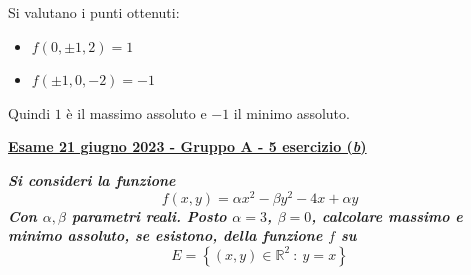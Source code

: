 \documentclass[a4paper]{article}
\newcommand{\definition}[1]{\textcolor{Red3}{\textbf{#1}}}
\newcommand{\example}[1]{\textcolor{Green4}{\textbf{#1}}}
\begin{document}
	Si valutano i punti ottenuti:
	\begin{multicols}{2}
		\begin{itemize}
			\item $f\left(0, \pm1, 2\right) = 1$
			\item $f\left(\pm1, 0, -2\right) = -1$
		\end{itemize}
	\end{multicols}
	Quindi $1$ è il massimo assoluto e $-1$ il minimo assoluto.

	\newpage

	\begin{flushleft}
		\label{exam: esame 21 giugno 2023 - Gruppo A - 5 esercizio (b)}
		\hypertarget{
			exam: esame 21 giugno 2023 - Gruppo A - 5 esercizio (b)
		}{
			\definition{\underline{Esame 21 giugno 2023 - Gruppo A - 5 esercizio (\emph{b})}}
		}
	\end{flushleft}
	\example{\emph{Si consideri la funzione}
	\begin{equation*}
		f\left(x,y\right) = \alpha x^{2} - \beta y^{2} - 4x + \alpha y
	\end{equation*}
	\emph{Con $\alpha, \beta$ parametri reali. Posto $\alpha = 3$, $\beta = 0$, calcolare massimo e minimo assoluto, se esistono, della funzione $f$ su}
	\begin{equation*}
		E = \left\{\left(x,y\right) \in \mathbb{R}^{2} \: : \: y = x\right\}
	\end{equation*}}
	
\end{document}
